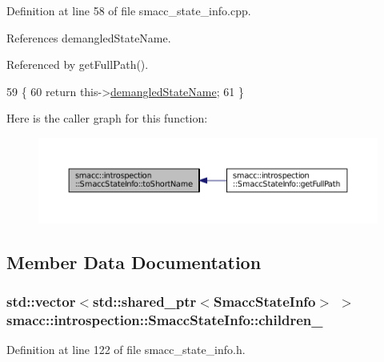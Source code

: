 Definition at line 58 of file smacc\+\_\+state\+\_\+info.\+cpp.



References demangled\+State\+Name.



Referenced by get\+Full\+Path().


\begin{DoxyCode}
59 \{
60     \textcolor{keywordflow}{return} this->\hyperlink{classsmacc_1_1introspection_1_1SmaccStateInfo_acf0014a819c23caad085ba6df13a17bf}{demangledStateName};
61 \}
\end{DoxyCode}


Here is the caller graph for this function\+:
\nopagebreak
\begin{figure}[H]
\begin{center}
\leavevmode
\includegraphics[width=350pt]{classsmacc_1_1introspection_1_1SmaccStateInfo_aa43c3733427618a141c3f6803913a88b_icgraph}
\end{center}
\end{figure}




\subsection{Member Data Documentation}
\subsubsection[{\texorpdfstring{children\+\_\+}{children_}}]{\setlength{\rightskip}{0pt plus 5cm}std\+::vector$<$std\+::shared\+\_\+ptr$<${\bf Smacc\+State\+Info}$>$ $>$ smacc\+::introspection\+::\+Smacc\+State\+Info\+::children\+\_\+}\hypertarget{classsmacc_1_1introspection_1_1SmaccStateInfo_a73eac049e8149b6eaeec735101c32ef9}{}\label{classsmacc_1_1introspection_1_1SmaccStateInfo_a73eac049e8149b6eaeec735101c32ef9}


Definition at line 122 of file smacc\+\_\+state\+\_\+info.\+h.



